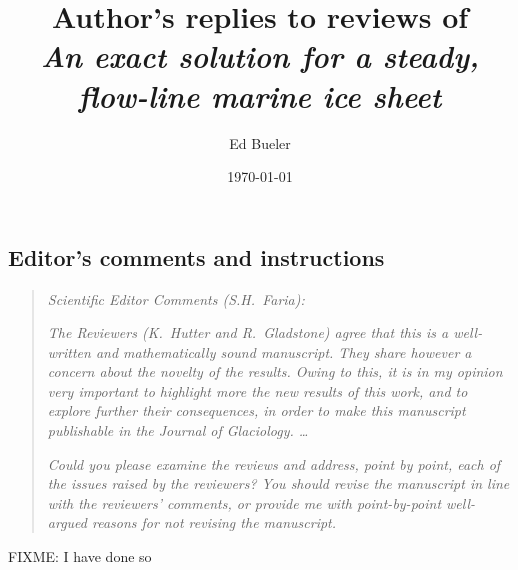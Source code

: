 \documentclass[11pt,reqno]{amsart}
\title[Author's replies to reviews of \emph{An exact solution \dots}]{Author's replies to reviews of \\ \emph{An exact solution for a steady, flow-line marine ice sheet}}
\author{Ed Bueler}
\date{\today}
\begin{document}
\maketitle

\thispagestyle{empty}



\subsection*{Editor's comments and instructions}  \begin{quote}
\emph{Scientific Editor Comments (S.H.~Faria):}

\emph{The Reviewers (K.~Hutter and R.~Gladstone) agree that this is a well-written and mathematically sound manuscript. They share however a concern about the novelty of the results. Owing to this, it is in my opinion very important to highlight more the new results of this work, and to explore further their consequences, in order to make this manuscript publishable in the Journal of Glaciology.  \dots}

\emph{Could you please examine the reviews and address, point by point, each of the issues raised by the reviewers? You should revise the manuscript in line with the reviewers' comments, or provide me with point-by-point well-argued reasons for not revising the manuscript.}
\end{quote}

\noindent FIXME:  I have done so
\end{document}
